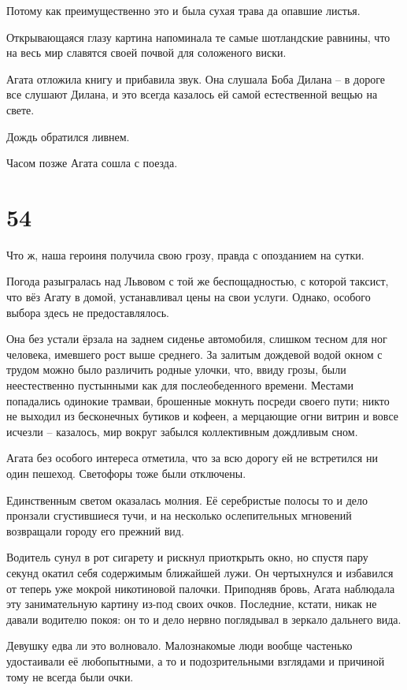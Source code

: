 \documentclass[
  a5paperpaper,
  DIV=11,
  numbers=noendperiod]{scrreprt}
\begin{document}
Потому как преимущественно это и была сухая трава да опавшие листья.

Открывающаяся глазу картина напоминала те самые шотландские равнины, что
на весь мир славятся своей почвой для соложеного виски.

Агата отложила книгу и прибавила звук. Она слушала Боба Дилана -- в
дороге все слушают Дилана, и это всегда казалось ей самой естественной
вещью на свете.

Дождь обратился ливнем.

Часом позже Агата сошла с поезда.

\section*{54}\label{54}


Что ж, наша героиня получила свою грозу, правда с опозданием на сутки.

Погода разыгралась над Львовом с той же беспощадностью, с которой
таксист, что вёз Агату в домой, устанавливал цены на свои услуги.
Однако, особого выбора здесь не предоставлялось.

Она без устали ёрзала на заднем сиденье автомобиля, слишком тесном для
ног человека, имевшего рост выше среднего. За залитым дождевой водой
окном с трудом можно было различить родные улочки, что, ввиду грозы,
были неестественно пустынными как для послеобеденного времени. Местами
попадались одинокие трамваи, брошенные мокнуть посреди своего пути;
никто не выходил из бесконечных бутиков и кофеен, а мерцающие огни
витрин и вовсе исчезли -- казалось, мир вокруг забылся коллективным
дождливым сном.

Агата без особого интереса отметила, что за всю дорогу ей не встретился
ни один пешеход. Светофоры тоже были отключены.

Единственным светом оказалась молния. Её серебристые полосы то и дело
пронзали сгустившиеся тучи, и на несколько ослепительных мгновений
возвращали городу его прежний вид.

Водитель сунул в рот сигарету и рискнул приоткрыть окно, но спустя пару
секунд окатил себя содержимым ближайшей лужи. Он чертыхнулся и избавился
от теперь уже мокрой никотиновой палочки. Приподняв бровь, Агата
наблюдала эту занимательную картину из-под своих очков. Последние,
кстати, никак не давали водителю покоя: он то и дело нервно поглядывал в
зеркало дальнего вида.

Девушку едва ли это волновало. Малознакомые люди вообще частенько
удостаивали её любопытными, а то и подозрительными взглядами и причиной
тому не всегда были очки.
\end{document}
